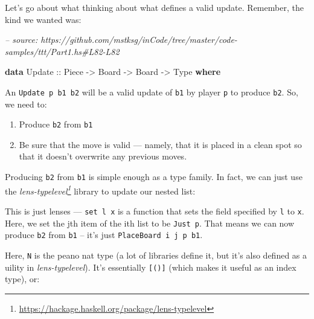 \documentclass[]{article}
\newenvironment{Shaded}{}{}
\newcommand{\CommentTok}[1]{\textcolor[rgb]{0.38,0.63,0.69}{\textit{#1}}}
\newcommand{\DataTypeTok}[1]{\textcolor[rgb]{0.56,0.13,0.00}{#1}}
\newcommand{\FunctionTok}[1]{\textcolor[rgb]{0.02,0.16,0.49}{#1}}
\newcommand{\KeywordTok}[1]{\textcolor[rgb]{0.00,0.44,0.13}{\textbf{#1}}}
\newcommand{\NormalTok}[1]{#1}
\newcommand{\OtherTok}[1]{\textcolor[rgb]{0.00,0.44,0.13}{#1}}
\renewcommand{\href}[2]{#2\footnote{\url{#1}}}
\begin{document}
Let's go about what thinking about what defines a valid update. Remember, the
kind we wanted was:

\begin{Shaded}
\begin{Highlighting}[]
\CommentTok{-- source: https://github.com/mstksg/inCode/tree/master/code-samples/ttt/Part1.hs#L82-L82}

\KeywordTok{data} \DataTypeTok{Update}\OtherTok{ ::} \DataTypeTok{Piece} \OtherTok{->} \DataTypeTok{Board} \OtherTok{->} \DataTypeTok{Board} \OtherTok{->} \DataTypeTok{Type} \KeywordTok{where}
\end{Highlighting}
\end{Shaded}

An \texttt{Update\ p\ b1\ b2} will be a valid update of \texttt{b1} by player
\texttt{p} to produce \texttt{b2}. So, we need to:

\begin{enumerate}
\def\labelenumi{\arabic{enumi}.}
\tightlist
\item
  Produce \texttt{b2} from \texttt{b1}
\item
  Be sure that the move is valid --- namely, that it is placed in a clean spot
  so that it doesn't overwrite any previous moves.
\end{enumerate}

Producing \texttt{b2} from \texttt{b1} is simple enough as a type family. In
fact, we can just use the
\emph{\href{https://hackage.haskell.org/package/lens-typelevel}{lens-typelevel}}
library to update our nested list:

\begin{Shaded}
\end{Shaded}

This is just lenses --- \texttt{set\ l\ x} is a function that sets the field
specified by \texttt{l} to \texttt{x}. Here, we set the jth item of the ith list
to be \texttt{Just\ p}. That means we can now produce \texttt{b2} from
\texttt{b1} -- it's just \texttt{PlaceBoard\ i\ j\ p\ b1}.

Here, \texttt{N} is the peano nat type (a lot of libraries define it, but it's
also defined as a uility in \emph{lens-typelevel}). It's essentially
\texttt{{[}(){]}} (which makes it useful as an index type), or:
\end{document}
